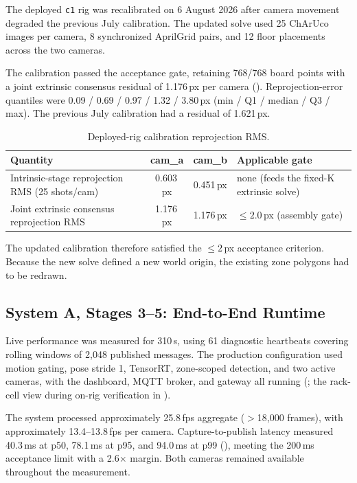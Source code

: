 \documentclass[9pt,a4paper,twocolumn]{rho-class/rho}
\begin{document}
The deployed \texttt{c1} rig was recalibrated on 6 August 2026 after camera movement degraded the previous July calibration. The updated solve used 25 ChArUco images per camera, 8 synchronized AprilGrid pairs, and 12 floor placements across the two cameras.

The calibration passed the acceptance gate, retaining 768/768 board points with a joint extrinsic consensus residual of 1.176\,px per camera (). Reprojection-error quantiles were 0.09 / 0.69 / 0.97 / 1.32 / 3.80\,px (min / Q1 / median / Q3 / max). The previous July calibration had a residual of 1.621\,px.

\begin{table}[tbp]
    \caption{Deployed-rig calibration reprojection RMS.}
    \label{tab:t3}
    \centering
    \footnotesize
    \begin{tabular}{>{\raggedright\arraybackslash}p{}ccp{}}
    \toprule
    \textbf{Quantity} & \textbf{cam\_a} & \textbf{cam\_b} & \textbf{Applicable gate} \\
    \midrule
    Intrinsic-stage reprojection RMS (25 shots/cam) & 0.603\,px & 0.451\,px & none (feeds the fixed-K extrinsic solve) \\
    Joint extrinsic consensus reprojection RMS & 1.176\,px & 1.176\,px & $\leq 2.0$\,px (assembly gate) \\
    \bottomrule
    \end{tabular}
\end{table}

The updated calibration therefore satisfied the $\leq 2$\,px acceptance criterion. Because the new solve defined a new world origin, the existing zone polygons had to be redrawn.

\subsection{System A, Stages 3--5: End-to-End Runtime}

Live performance was measured for 310\,s, using 61 diagnostic heartbeats covering rolling windows of 2{,}048 published messages. The production configuration used motion gating, pose stride 1, TensorRT, zone-scoped detection, and two active cameras, with the dashboard, MQTT broker, and gateway all running (; the rack-cell view during on-rig verification in ).

The system processed approximately 25.8\,fps aggregate ($>$18{,}000 frames), with approximately 13.4--13.8\,fps per camera. Capture-to-publish latency measured 40.3\,ms at p50, 78.1\,ms at p95, and 94.0\,ms at p99 (), meeting the 200\,ms acceptance limit with a 2.6$\times$ margin. Both cameras remained available throughout the measurement.
\end{document}
